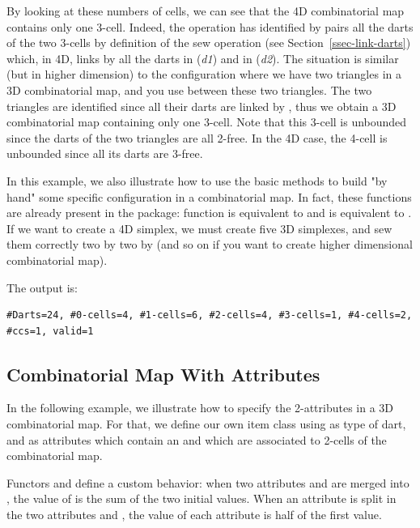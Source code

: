 By looking at these numbers of cells, we can see that the 4D
combinatorial map contains only one 3-cell. Indeed, the 
operation has identified by pairs all the darts of the two 3-cells
by definition of the sew operation (see Section~\ref{ssec-link-darts})
which, in 4D, links by \betatrois{} all the darts in
\orbit{\betaun{},\betadeux{}}(\emph{d1}) and in 
\orbit{\betaun{},\betadeux{}}(\emph{d2}).  The
situation is similar (but in higher dimension) to the
configuration where we have two triangles in a 3D combinatorial map,
and you use  between these two triangles. The two triangles
are identified since all their darts are linked by \betatrois{}, thus we
obtain a 3D combinatorial map containing only one 3-cell. Note that
this 3-cell is unbounded since the darts of the two triangles are all
2-free. In the 4D case, the 4-cell is unbounded since all its darts
are 3-free.

In this example, we also illustrate how to use the basic methods to
build "by hand" some specific configuration in a combinatorial
map. In fact, these functions are already present in the package:
function  is equivalent to
 and
 is equivalent to
.  If we want to create a 4D
simplex, we must create five 3D simplexes, and sew them correctly
two by two by \betatrois{} (and so on if you want to create higher
dimensional combinatorial map).


The output is:
\begin{verbatim}
#Darts=24, #0-cells=4, #1-cells=6, #2-cells=4, #3-cells=1, #4-cells=2, #ccs=1, valid=1
\end{verbatim}

\subsection{Combinatorial Map With Attributes}
\label{ssec-combi-map-with-color}
In the following example, we illustrate how to specify the
2-attributes in a 3D combinatorial map. For that, we define our own
item class using  as type of dart, and
as attributes which contain an  and which are associated to
2-cells of the combinatorial map.

Functors  and  define a
custom behavior: when two attributes  and  are
merged into , the value of  is the sum of the
two initial values.  When an attribute  is split in the two
attributes  and , the value of each attribute is
half of the first value.

